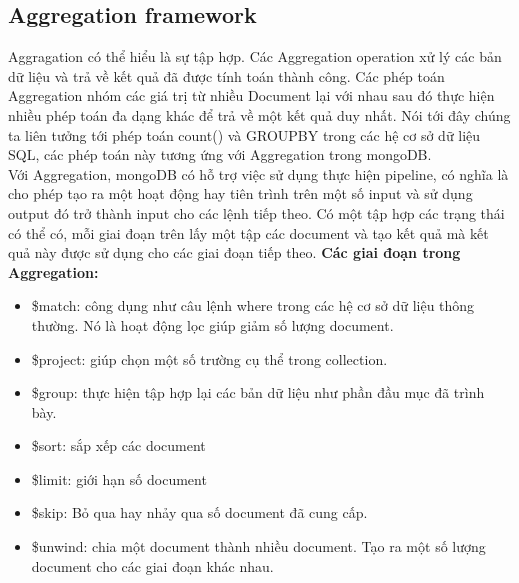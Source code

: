 \subsection{Aggregation framework}
Aggragation có thể hiểu là sự tập hợp. Các Aggregation operation xử lý các bản dữ liệu và trả về kết quả đã được tính toán thành công. Các phép toán Aggregation nhóm các giá trị từ nhiều Document lại với nhau sau đó thực hiện nhiều phép toán đa dạng khác để trả về một kết quả duy nhất. Nói tới đây chúng ta liên tưởng tới phép toán count() và GROUPBY trong các hệ cơ sở dữ liệu SQL, các phép toán này tương ứng với Aggregation trong mongoDB.\\
Với Aggregation, mongoDB có hỗ trợ việc sử dụng thực hiện pipeline, có nghĩa là cho phép tạo ra một hoạt động hay tiên trình trên một số input và sử dụng output đó trở thành input cho các lệnh tiếp theo. Có một tập hợp các trạng thái có thể có, mỗi giai đoạn trên lấy một tập các document và tạo kết quả mà kết quả này được sử dụng cho các giai đoạn tiếp theo.
\textbf{Các giai đoạn trong Aggregation:}
\begin{itemize}
	\item \$match: công dụng như câu lệnh where trong các hệ cơ sở dữ liệu thông thường. Nó là hoạt động lọc giúp giảm số lượng document.
	\item \$project: giúp chọn một số trường cụ thể trong collection.
	\item \$group: thực hiện tập hợp lại các bản dữ liệu như phần đầu mục đã trình bày.
	\item \$sort: sắp xếp các document
	\item \$limit: giới hạn số document
	\item \$skip: Bỏ qua hay nhảy qua số document đã cung cấp.
	\item \$unwind: chia một document thành nhiều document. Tạo ra một số lượng document cho các giai đoạn khác nhau.
\end{itemize}
\pagebreak
